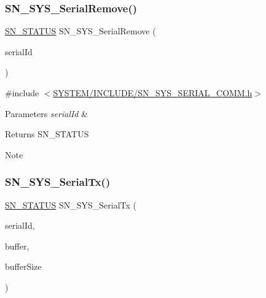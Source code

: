 \subsubsection{\texorpdfstring{S\+N\+\_\+\+S\+Y\+S\+\_\+\+Serial\+Remove()}{SN\_SYS\_SerialRemove()}}
{\footnotesize\ttfamily \hyperlink{group__SYSTEM__ERROR_ga4540713b9a7a18ce44d78c3a10f7442f}{S\+N\+\_\+\+S\+T\+A\+T\+US} S\+N\+\_\+\+S\+Y\+S\+\_\+\+Serial\+Remove (\begin{DoxyParamCaption}\item[{\hyperlink{structsys__serial__id}{sys\+Serial\+Id}}]{serial\+Id }\end{DoxyParamCaption})}



{\ttfamily \#include $<$\hyperlink{SN__SYS__SERIAL__COMM_8h}{S\+Y\+S\+T\+E\+M/\+I\+N\+C\+L\+U\+D\+E/\+S\+N\+\_\+\+S\+Y\+S\+\_\+\+S\+E\+R\+I\+A\+L\+\_\+\+C\+O\+M\+M.\+h}$>$}


\begin{DoxyParams}{Parameters}
{\em serial\+Id} & \\
\hline
\end{DoxyParams}
\begin{DoxyReturn}{Returns}
S\+N\+\_\+\+S\+T\+A\+T\+US 
\end{DoxyReturn}
\begin{DoxyNote}{Note}

\end{DoxyNote}
\mbox{\label{group__SYSTEM__SERIAL__COMM_ga0ef5403b40b3522653366b6246dbf752}} 
\subsubsection{\texorpdfstring{S\+N\+\_\+\+S\+Y\+S\+\_\+\+Serial\+Tx()}{SN\_SYS\_SerialTx()}}
{\footnotesize\ttfamily \hyperlink{group__SYSTEM__ERROR_ga4540713b9a7a18ce44d78c3a10f7442f}{S\+N\+\_\+\+S\+T\+A\+T\+US} S\+N\+\_\+\+S\+Y\+S\+\_\+\+Serial\+Tx (\begin{DoxyParamCaption}\item[{\hyperlink{structsys__serial__id}{sys\+Serial\+Id}}]{serial\+Id,  }\item[{char $\ast$}]{buffer,  }\item[{size\+\_\+t}]{buffer\+Size }\end{DoxyParamCaption})}



